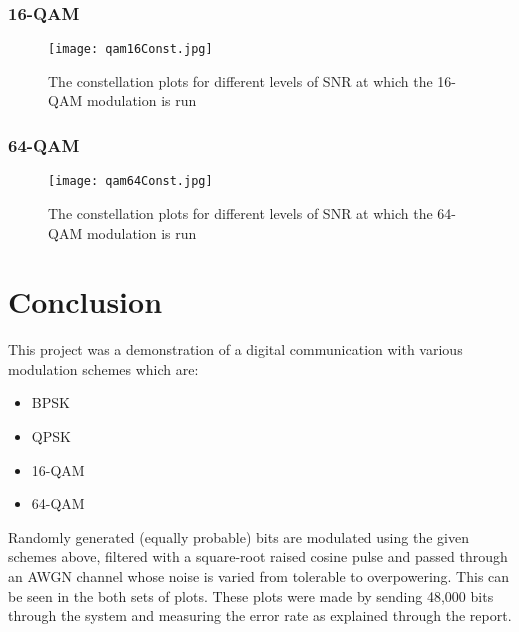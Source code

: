 \documentclass[]{article}
\begin{document}
\subsubsection{16-QAM}
\begin{figure}[H]
\centering
\hspace*{-2cm}\texttt{[image: qam16Const.jpg]}
\caption{The constellation plots for different levels of SNR at which the 16-QAM modulation is run}
\end{figure}
\subsubsection{64-QAM}
\begin{figure}[H]
\centering
\hspace*{-2cm}\texttt{[image: qam64Const.jpg]}
\caption{The constellation plots for different levels of SNR at which the 64-QAM modulation is run}
\end{figure}

\newpage

\section{Conclusion}
\label{sec:conc}
This project was a demonstration of a digital communication with various modulation schemes which are:
\begin{itemize}
\item BPSK
\item QPSK
\item 16-QAM
\item 64-QAM
\end{itemize}

Randomly generated (equally probable) bits are modulated using the given schemes above, filtered with a square-root raised cosine pulse and passed through an AWGN channel whose noise is varied from tolerable to overpowering.  This can be seen in the both sets of plots.  These plots were made by sending 48,000 bits through the system and measuring the error rate as explained through the report.
\end{document}
